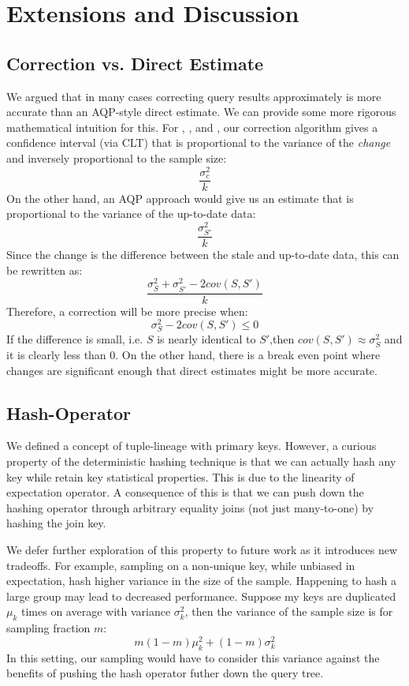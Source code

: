 
\section{Extensions and Discussion}\label{sec:ext}

\subsection{Correction vs. Direct Estimate}
We argued that in many cases correcting query results approximately is more accurate than an
AQP-style direct estimate. 
We can provide some more rigorous mathematical intuition for this.
For \sumfunc, \countfunc, and \avgfunc, our correction algorithm gives a confidence interval (via CLT) that is
proportional to the variance of the \emph{change} and inversely proportional to the sample size:
\[\frac{\sigma_{c}^2}{k}\]
On the other hand, an AQP approach would give us an estimate that is proportional to the variance of the up-to-date data:
\[\frac{\sigma_{S'}^2}{k}\]
Since the change is the difference between the stale and up-to-date data, this can be rewritten as: 
\[\frac{\sigma_{S}^2 + \sigma_{S'}^2 - 2cov(S,S')}{k}\]
Therefore, a correction will be more precise when:
\[\sigma_{S}^2 - 2cov(S,S') \le 0 \]
If the difference is small, i.e. $S$ is nearly identical to $S'$,then $cov(S,S') \approx \sigma_{S}^2$ and it is clearly less than 0.
On the other hand, there is a break even point where changes are significant enough that direct estimates might be more accurate.

\subsection{Hash-Operator}
We defined a concept of tuple-lineage with primary keys.
However, a curious property of the deterministic hashing technique is that we can actually hash any key while retain key
statistical properties.
This is due to the linearity of expectation operator.
A consequence of this is that we can push down the hashing operator through arbitrary equality joins (not just many-to-one) by hashing the join key.

We defer further exploration of this property to future work as it introduces new tradeoffs.
For example, sampling on a non-unique key, while unbiased in expectation, hash higher variance in the size of the sample.
Happening to hash a large group may lead to decreased performance. 
Suppose my keys are duplicated $\mu_k$ times on average with variance $\sigma_k^2$, then the variance of the
sample size is for sampling fraction $m$:
\[m(1-m)\mu_k^2+(1-m)\sigma_k^2\]
In this setting, our sampling would have to consider this variance against the benefits of pushing the hash operator futher down the query tree. 

